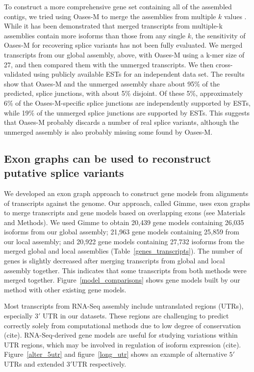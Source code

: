\documentclass[10pt]{article}
\begin{document}
To construct a more comprehensive gene set containing all of the
assembled contigs, we tried using Oases-M to merge the assemblies from
multiple $k$ values \cite{Schulz:2012je}.  While it has been
demonstrated that merged transcripts from multiple-k assemblies
contain more isoforms than those from any single $k$, the sensitivity
of Oases-M for recovering splice variants has not been fully
evaluated.  We merged transcripts from our global assembly, above,
with Oases-M using a k-mer size of 27, and then compared them with the
unmerged transcripts.  We then cross-validated using publicly
available ESTs for an independent data set.  The results show that
Oases-M and the unmerged assembly share about 95\% of the predicted,
splice junctions, with about 5\% disjoint.  Of these 5\%,
approximately 6\% of the Oases-M-specific splice junctions are
independently supported by ESTs, while 19\% of the unmerged splice
junctions are supported by ESTs.  This suggests that Oases-M probably
discards a number of real splice variants, although the unmerged
assembly is also probably missing some found by Oases-M.


\subsection*{Exon graphs can be used to reconstruct putative splice variants}

We developed an exon graph approach to construct gene models from
alignments of transcripts against the genome.  Our approach, called
Gimme, uses exon graphs to merge transcripts and gene models based on
overlapping exons (see Materials and Methods).  We used Gimme to
obtain 20,439 gene models containing 26,035 isoforms from our global
assembly; 21,963 gene models containing 25,859 from our local
assembly; and 20,922 gene models containing 27,732 isoforms from the
merged global and local assemblies (Table~\ref{genes_transcripts}).
The number of genes is slightly decreased after merging transcripts
from global and local assembly together. 
This indicates that some transcripts from both methods were merged together.
Figure~\ref{model_comparisons} shows gene models built by our method with
other existing gene models.

Most transcripts from RNA-Seq assembly include untranslated regions (UTRs),
especially $3'$ UTR in our datasets.
These regions are challenging to predict correctly solely from computational
methods due to low degree of conservation (cite).
RNA-Seq-derived gene models are useful for studying variations within UTR regions,
which may be involved in regulation of isoform expression (cite).
Figure~\ref{alter_5utr} and figure~\ref{long_utr} shows an example of alternative
$5'$UTRs and extended $3'$UTR respectively.
\end{document}
